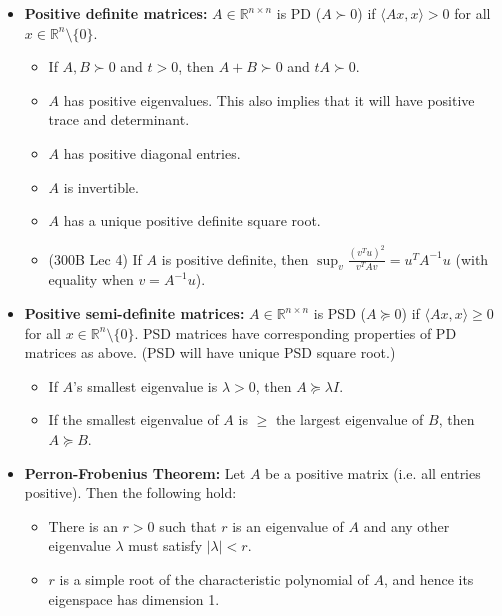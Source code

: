 \documentclass[twoside]{article}
\newcommand{\dis}{\displaystyle}
\newcommand\bbR{\mathbb{R}}
\newcommand\lmb{\lambda}
\begin{document}
\begin{itemize}
\item \textbf{Positive definite matrices:} $A \in \bbR^{n \times n}$ is PD ($A \succ 0$) if $\langle Ax, x\rangle > 0$ for all $x \in \bbR^n \setminus \{0\}$.
\begin{itemize}
\item If $A, B \succ 0$ and $t > 0$, then $A + B \succ 0$ and $tA \succ 0$.

\item $A$ has positive eigenvalues. This also implies that it will have positive trace and determinant.

\item $A$ has positive diagonal entries.

\item $A$ is invertible.

\item $A$ has a unique positive definite square root.

\item (300B Lec 4) If $A$ is positive definite, then $\dis\sup_v \frac{(v^T u)^2}{v^T A v} = u^T A^{-1}u$ (with equality when $v = A^{-1}u$).
\end{itemize}

\item \textbf{Positive semi-definite matrices:} $A \in \bbR^{n \times n}$ is PSD ($A \succeq 0$) if $\langle Ax, x\rangle \geq 0$ for all $x \in \bbR^n \setminus \{0\}$. PSD matrices have corresponding properties of PD matrices as above. (PSD will have unique PSD square root.)
\begin{itemize}
\item If $A$'s smallest eigenvalue is $\lmb > 0$, then $A \succeq \lmb I$.

\item If the smallest eigenvalue of $A$ is $\geq$ the largest eigenvalue of $B$, then $A \succeq B$.
\end{itemize}

\item \textbf{Perron-Frobenius Theorem:} Let $A$ be a positive matrix (i.e. all entries positive). Then the following hold:
\begin{itemize}
\item There is an $r > 0$ such that $r$ is an eigenvalue of $A$ and any other eigenvalue $\lmb$ must satisfy $|\lmb| < r$.

\item $r$ is a simple root of the characteristic polynomial of $A$, and hence its eigenspace has dimension 1.


\end{itemize}
\end{itemize}
\end{document}
